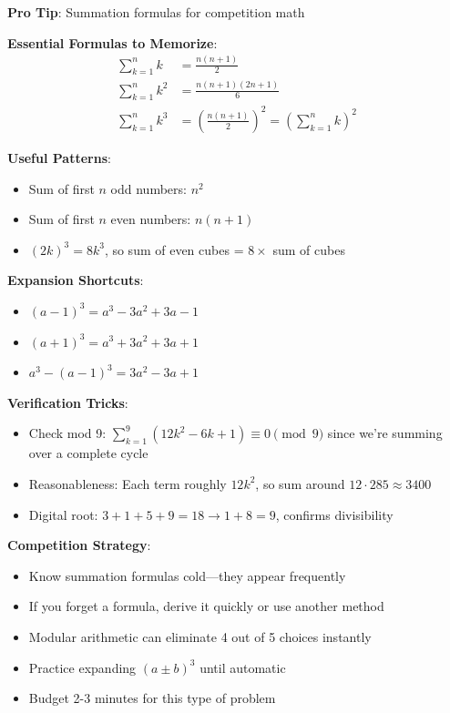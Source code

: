 \documentclass[12pt]{article}
\begin{document}
\begin{tipbox}
\textbf{Pro Tip}: Summation formulas for competition math

\textbf{Essential Formulas to Memorize}:
\begin{align*}
\sum_{k=1}^{n} k &= \frac{n(n+1)}{2}\\
\sum_{k=1}^{n} k^2 &= \frac{n(n+1)(2n+1)}{6}\\
\sum_{k=1}^{n} k^3 &= \left(\frac{n(n+1)}{2}\right)^2 = \left(\sum_{k=1}^{n} k\right)^2
\end{align*}

\textbf{Useful Patterns}:
\begin{itemize}
    \item Sum of first $n$ odd numbers: $n^2$
    \item Sum of first $n$ even numbers: $n(n+1)$
    \item $(2k)^3 = 8k^3$, so sum of even cubes = $8 \times$ sum of cubes
\end{itemize}

\textbf{Expansion Shortcuts}:
\begin{itemize}
    \item $(a-1)^3 = a^3 - 3a^2 + 3a - 1$
    \item $(a+1)^3 = a^3 + 3a^2 + 3a + 1$
    \item $a^3 - (a-1)^3 = 3a^2 - 3a + 1$
\end{itemize}

\textbf{Verification Tricks}:
\begin{itemize}
    \item Check mod 9: $\sum_{k=1}^{9} (12k^2 - 6k + 1) \equiv 0 \pmod{9}$ since we're summing over a complete cycle
    \item Reasonableness: Each term roughly $12k^2$, so sum around $12 \cdot 285 \approx 3400$
    \item Digital root: $3+1+5+9 = 18 \rightarrow 1+8 = 9$, confirms divisibility
\end{itemize}

\textbf{Competition Strategy}:
\begin{itemize}
    \item Know summation formulas cold—they appear frequently
    \item If you forget a formula, derive it quickly or use another method
    \item Modular arithmetic can eliminate 4 out of 5 choices instantly
    \item Practice expanding $(a \pm b)^3$ until automatic
    \item Budget 2-3 minutes for this type of problem
\end{itemize}
\end{tipbox}
\end{document}
